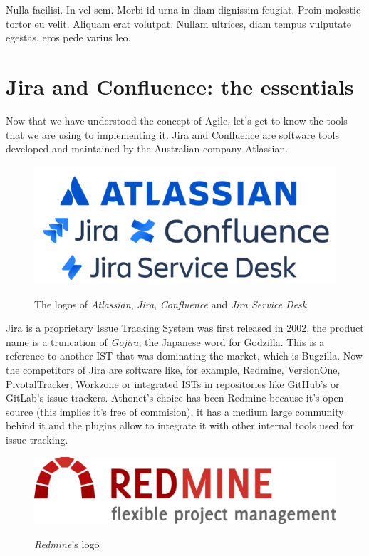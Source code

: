 \begin{savequote}[75mm]
Nulla facilisi. In vel sem. Morbi id urna in diam dignissim feugiat. Proin molestie tortor eu velit. Aliquam erat volutpat. Nullam ultrices, diam tempus vulputate egestas, eros pede varius leo.
\end{savequote}

\chapter{Jira and Confluence: the essentials}

Now that we have understood the concept of Agile, let's get to know the tools that we are using to implementing it.
Jira and Confluence are software tools developed and maintained by the Australian company Atlassian.

\begin{figure}[H]
	\centering
	\includegraphics[width=.7\textwidth]{resources/atlassian_logo}\\
	\caption{The logos of \textit{Atlassian}, \textit{Jira}, \textit{Confluence} and \textit{Jira Service Desk}}
\end{figure}

Jira is a proprietary Issue Tracking System was first released in 2002, the product name is a truncation of \textit{Gojira}, the Japanese word for Godzilla. This is a reference to another IST that was dominating the market, which is Bugzilla.
Now the competitors of Jira are software like, for example, Redmine, VersionOne, PivotalTracker, Workzone or integrated ISTs in repositories like GitHub's or GitLab's issue trackers.
Athonet's choice has been Redmine because it's open source (this implies it's free of commision), it has a medium large community behind it and the plugins allow to integrate it with other internal tools used for issue tracking.

\begin{figure}[H]
	\centering
	\includegraphics[width=.4\textwidth]{resources/redmine_logo}\\
	\caption{\textit{Redmine}'s logo}
\end{figure}

